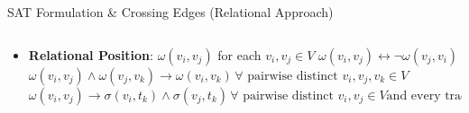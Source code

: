 \documentclass[hyperref={pdfpagelabels=false},aspectratio=169]{beamer}
\theoremstyle{definition}
\begin{document}
\begin{frame}{SAT Formulation \& Crossing Edges (Relational Approach)}
    \begin{columns}
        \begin{column}{1\textwidth}
            \begin{itemize}
                \item \textbf{Relational Position}:  $\omega(v_i,v_j)$ for each $v_i,v_j \in V$
                \newline
                \newline
                \cdot $ \omega(v_i,v_j) \leftrightarrow \lnot \omega(v_j,v_i) $
                \newline
                \newline
                \cdot $ \omega(v_i,v_j) \land \omega(v_j,v_k) \rightarrow \omega(v_i,v_k) \, \forall \text{ pairwise distinct } v_i,v_j,v_k \in V$
                \newline
                \newline
                \cdot $ \omega(v_i,v_j) \rightarrow \sigma(v_i,t_k) \land \sigma(v_j,t_k) \, \forall \text{ pairwise distinct } v_i,v_j \in V \text{and every track }t$
            \end{itemize}
        \end{column}
    \end{columns}
\end{frame}
\end{document}
